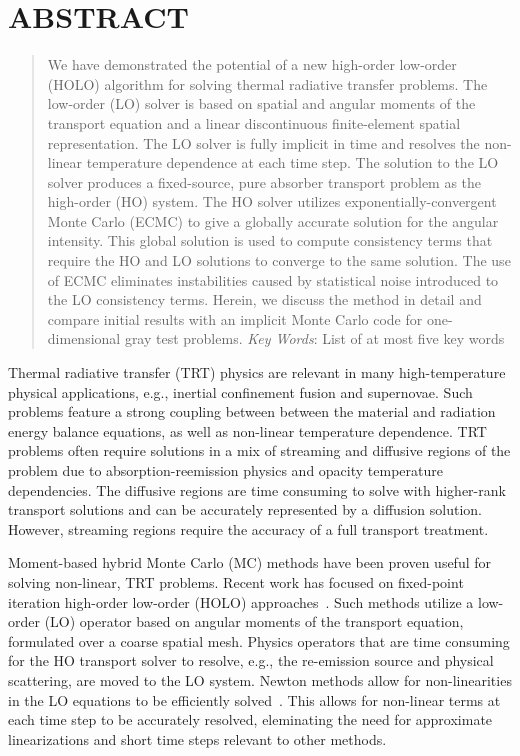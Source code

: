 \documentclass{mc2013}
\begin{document}
\section*{ABSTRACT} 
\begin{quote}
\begin{small}
We have demonstrated the potential of a new high-order low-order (HOLO) algorithm for solving
thermal radiative transfer problems.  The low-order (LO) solver is based on spatial
and angular moments of the transport equation and a linear discontinuous
finite-element spatial representation.  
The LO solver is fully implicit in time and resolves the non-linear
temperature dependence at each time step.  The solution to the LO solver produces a
fixed-source, pure absorber transport problem as the high-order (HO) system.  The HO solver
utilizes exponentially-convergent Monte Carlo (ECMC) to give a globally accurate solution
for the angular intensity.  This global solution is used to compute consistency terms
that require the HO and LO solutions to converge to the same solution.  The use of ECMC
eliminates instabilities caused by statistical noise introduced to the LO consistency
terms.  Herein, we discuss the method in detail and compare initial results with an
implicit Monte Carlo code for one-dimensional gray test problems.
\emph{Key Words}: List of at most five key words

\end{small} 
\end{quote}

\setlength{\baselineskip}{14pt}
\normalsize


Thermal radiative transfer (TRT) physics are relevant in many high-temperature physical applications,
e.g., inertial confinement fusion and supernovae.  Such problems feature a strong
coupling between between the material and radiation energy balance equations, as well
as non-linear temperature dependence.  TRT problems often require solutions in a mix of
streaming and diffusive regions of the problem due to absorption-reemission physics
and opacity temperature dependencies. The diffusive regions are time
consuming to solve with higher-rank transport solutions and can be accurately
represented by a diffusion solution.  However, streaming regions require the accuracy of
a full transport treatment. 

Moment-based hybrid Monte Carlo (MC) methods have been proven useful for solving
non-linear, TRT problems. Recent work has focused on fixed-point iteration high-order low-order
(HOLO) approaches~\cite{willert,park,rmc}.   Such methods utilize a low-order (LO) operator based on angular moments of the
transport equation, formulated over a coarse spatial mesh.
Physics operators that are time
consuming for the HO transport solver to resolve, e.g., the re-emission source and
physical scattering, are moved to the LO system.  
Newton methods allow for non-linearities in the LO equations to
be efficiently solved~\cite{willert}. This allows for non-linear
terms at each time step to be accurately resolved, eleminating the need for
approximate linearizations and short time steps relevant to other methods.
\end{document}
